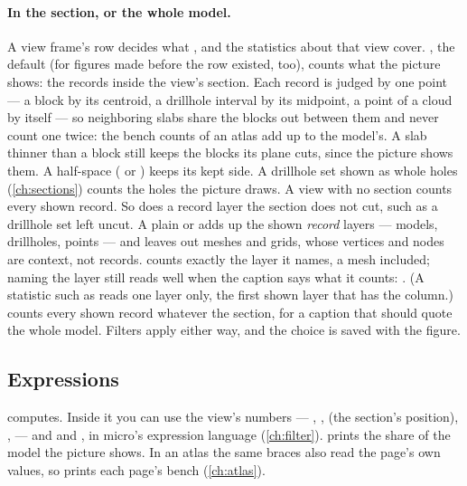 \paragraph{In the section, or the whole model.}\label{sec:compo-statsscope} A view frame's  row decides what ,  and the statistics about that view cover. , the default (for figures made before the row existed, too), counts what the picture shows: the records inside the view's section. Each record is judged by one point — a block by its centroid, a drillhole interval by its midpoint, a point of a cloud by itself — so neighboring slabs share the blocks out between them and never count one twice: the bench counts of an atlas add up to the model's. A slab thinner than a block still keeps the blocks its plane cuts, since the picture shows them. A half-space ( or ) keeps its kept side. A drillhole set shown as whole holes (\cref{ch:sections}) counts the holes the picture draws. A view with no section counts every shown record. So does a record layer the section does not cut, such as a drillhole set left uncut. A plain  or  adds up the shown \emph{record} layers — models, drillholes, points — and leaves out meshes and grids, whose vertices and nodes are context, not records.  counts exactly the layer it names, a mesh included; naming the layer still reads well when the caption says what it counts: . (A statistic such as  reads one layer only, the first shown layer that has the column.)  counts every shown record whatever the section, for a caption that should quote the whole model. Filters apply either way, and the choice is saved with the figure.

\subsection{Expressions}

 computes. Inside it you can use the view's numbers — , ,  (the section's position), ,  — and  and , in micro's expression language (\cref{ch:filter}).  prints the share of the model the picture shows. In an atlas the same braces also read the page's own values, so  prints each page's bench (\cref{ch:atlas}).

